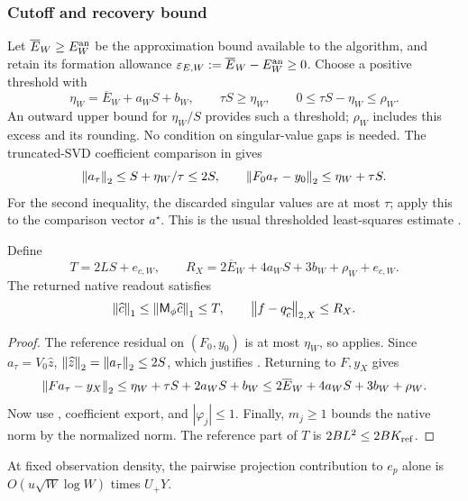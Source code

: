 \subsubsection{Cutoff and recovery bound}
Let $\overline E_W\ge E_W^{\rm an}$ be the approximation bound available to
the algorithm, and retain its formation allowance
$\varepsilon_{E,W}:=\overline E_W-E_W^{\rm an}\ge0$.
Choose a positive threshold with
\begin{equation}
 \eta_W=\overline E_W+a_WS+b_W,\qquad
 \tau S\ge\eta_W,\qquad 0\le\tau S-\eta_W\le\rho_W.
 \label{eq:eta}
\end{equation}
An outward upper bound for $\eta_W/S$ provides such a threshold; $\rho_W$
includes this excess and its rounding. No condition on singular-value gaps
is needed. The truncated-SVD coefficient comparison in
\cite[Theorem~3.8, first inequality]{AdcockHuybrechs2020} gives
\begin{equation}
 \left\lVert a_\tau\right\rVert_2\le S+\eta_W/\tau\le2S,
 \qquad \left\lVert F_0a_\tau-y_0\right\rVert_2\le\eta_W+\tau S.
 \label{eq:tsvd-standard}
\end{equation}
For the second inequality, the discarded singular values are at most $\tau$;
apply this to the comparison vector $a^\star$. This is the usual
thresholded least-squares estimate \cite{Hansen1987TSVD}.

\begin{proposition}
\label{prop:svd-recovery}
Define
\begin{equation}
 T=2LS+e_{c,W},\qquad
 R_X=2\overline E_W+4a_WS+3b_W+\rho_W+e_{c,W}.
 \label{eq:T-RX}
\end{equation}
The returned native readout satisfies
\begin{equation}
 \left\lVert \widehat c\right\rVert_1\le\left\lVert \mathsf M_\phi\widehat c\right\rVert_1\le T,
 \qquad \left\lVert f-q_{\widehat c}\right\rVert_{2,X}\le R_X.
 \label{eq:sampled-recovery}
\end{equation}
\end{proposition}
\begin{proof}
The reference residual on $(F_0,y_0)$ is at most $\eta_W$, so
 applies. Since $a_\tau=V_0\widehat z$,
$\left\lVert \widehat z\right\rVert_2=\left\lVert a_\tau\right\rVert_2\le2S$, which justifies
. Returning to $F,y_X$ gives
\[
 \left\lVert Fa_\tau-y_X\right\rVert_2
 \le\eta_W+\tau S+2a_WS+b_W
 \le2\overline E_W+4a_WS+3b_W+\rho_W.
\]
Now use , coefficient export, and
$|\varphi_j|\le1$. Finally, $m_j\ge1$ bounds the native norm by the normalized
norm. The reference part of $T$ is $2BL^2\le2BK_{\rm ref}$.
\end{proof}
At fixed observation density, the pairwise projection contribution to
$e_p$ alone is $O(u\sqrt W\log W)$ times $U_+Y$.

